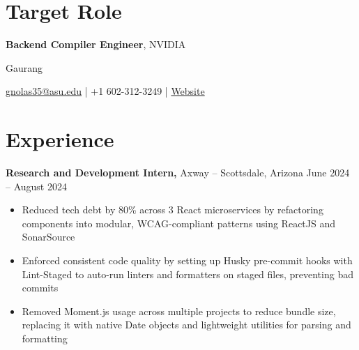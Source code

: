\documentclass[11pt]{article}       %
\begin{document}
\section*{Target Role}
\textbf{Backend Compiler Engineer}, NVIDIA\\
\vspace{10pt}


\centerline{\Huge Gaurang}
\vspace{5pt}

\centerline{\href{mailto:gnolas35@asu.edu}{gnolas35@asu.edu} | +1 602-312-3249 
| \href{https://portfolio-sinedd777s-projects.vercel.app/}{Website}}
\vspace{-10pt}

\section*{Experience}
\textbf{Research and Development Intern,} {Axway} -- Scottsdale, Arizona \hfill June 2024 -- August 2024 \\
\vspace{-9pt}
\begin{itemize}
\item Reduced tech debt by 80\% across 3 React microservices by refactoring components into modular, WCAG-compliant patterns using ReactJS and SonarSource
\item Enforced consistent code quality by setting up Husky pre-commit hooks with Lint-Staged to auto-run linters and formatters on staged files, preventing bad commits
\item Removed Moment.js usage across multiple projects to reduce bundle size, replacing it with native Date objects and lightweight utilities for parsing and formatting
\end{itemize}
\vspace{10pt}
\end{document}
